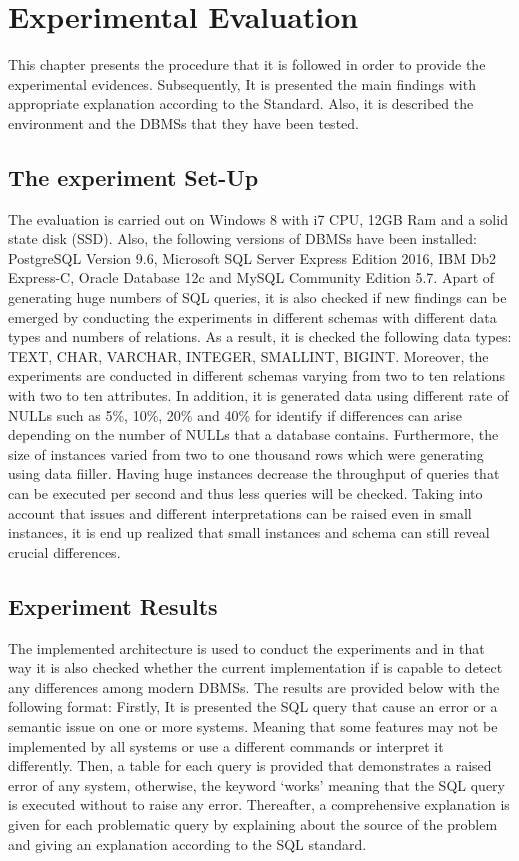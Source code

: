\chapter{Experimental Evaluation}
This chapter presents the procedure that it is followed in order to provide the experimental evidences. Subsequently, It is presented the main findings with appropriate explanation according to the Standard. Also, it is described  the environment and the DBMSs that they have been tested. 

\section{The experiment Set-Up}
The evaluation is carried out on Windows 8 with i7 CPU, 12GB Ram and a solid state disk (SSD). Also, the  following versions of DBMSs have been installed: PostgreSQL Version 9.6, Microsoft SQL Server Express Edition 2016, IBM Db2 Express-C, Oracle Database 12c and  MySQL Community Edition 5.7. 
Apart of generating huge numbers of SQL queries, it is also checked if new findings can be emerged by conducting the experiments in different schemas with different data types and numbers of relations. As a result, it is checked the following data types:  TEXT, CHAR, VARCHAR, INTEGER, SMALLINT, BIGINT. Moreover, the experiments are conducted in different schemas varying from two to ten relations with two to ten attributes. In addition, it is generated data using different rate of NULLs such as 5\%, 10\%, 20\% and 40\% for identify if differences can arise depending on the number of NULLs that a database contains.  Furthermore, the size of instances varied from two to one thousand rows which were generating using data fiiller. Having huge instances decrease the throughput of queries that can be executed per second and thus less queries will be checked. Taking into account that issues and different interpretations can be raised even in small instances, it is end up realized that small instances and schema can still reveal crucial differences. 

\section{Experiment Results}
The implemented architecture is used to conduct the experiments and in that way it is also checked whether the current implementation if is capable to detect any differences among modern DBMSs. The results are provided below with the following format: Firstly,  It is presented  the SQL query that cause an error or a semantic issue on one or more systems. Meaning that some features may not be implemented by all systems or use a different commands or interpret it differently.  Then, a table for each query is provided that demonstrates a raised error of any system, otherwise, the keyword ‘works’ meaning that the SQL query is executed without to raise any error. Thereafter, a comprehensive explanation is given for each problematic query by explaining about the source of the problem and giving an explanation according to the SQL standard.   

